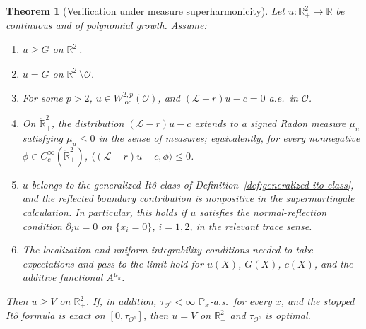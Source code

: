 \documentclass[pdflatex,sn-mathphys-num]{sn-jnl}
\theoremstyle{plain}
\newtheorem{theorem}{Theorem}[section]
\theoremstyle{definition}
\newcommand{\R}{\mathbb{R}}
\newcommand{\interior}[1]{\mathring{#1}}
\begin{document}
\begin{theorem}[Verification under measure superharmonicity]
\label{thm:verification-measure}
Let $u:\R^2_+\to\R$ be continuous and of polynomial growth. Assume:
\begin{enumerate}
\item[\textup{(V1)}] $u\ge G$ on $\R^2_+$.
\item[\textup{(V2)}] $u=G$ on $\R^2_+\setminus\mathcal O$.
\item[\textup{(V3)}] For some $p>2$, $u\in W^{2,p}_{\mathrm{loc}}(\mathcal O)$,
and $(\mathcal L-r)u-c=0$ a.e.\ in $\mathcal O$.
\item[\textup{(V4)}] On $\interior{\R}^2_+$, the distribution
$(\mathcal L-r)u-c$ extends to a signed Radon measure $\mu_u$ satisfying
$\mu_u\le0$ in the sense of measures; equivalently, for every nonnegative
$\phi\in C_c^\infty(\interior{\R}^2_+)$,
$\langle(\mathcal L-r)u-c,\phi\rangle\le0$.
\item[\textup{(V5)}] $u$ belongs to the generalized It\^o class of
Definition~\ref{def:generalized-ito-class}, and the reflected boundary
contribution is nonpositive in the supermartingale calculation. In particular,
this holds if $u$ satisfies the normal-reflection condition $\partial_i u=0$
on $\{x_i=0\}$, $i=1,2$, in the relevant trace sense.
\item[\textup{(V6)}] The localization and uniform-integrability conditions
needed to take expectations and pass to the limit hold for $u(X)$, $G(X)$,
$c(X)$, and the additive functional $A^{\mu_u}$.
\end{enumerate}
Then $u\ge V$ on $\R^2_+$. If, in addition, $\tau_{\mathcal O^c}<\infty$
$\mathbb P_x$-a.s.\ for every $x$, and the stopped It\^o formula is exact on
$[0,\tau_{\mathcal O^c}]$, then $u=V$ on $\R^2_+$ and $\tau_{\mathcal O^c}$ is
optimal.
\end{theorem}
\end{document}
